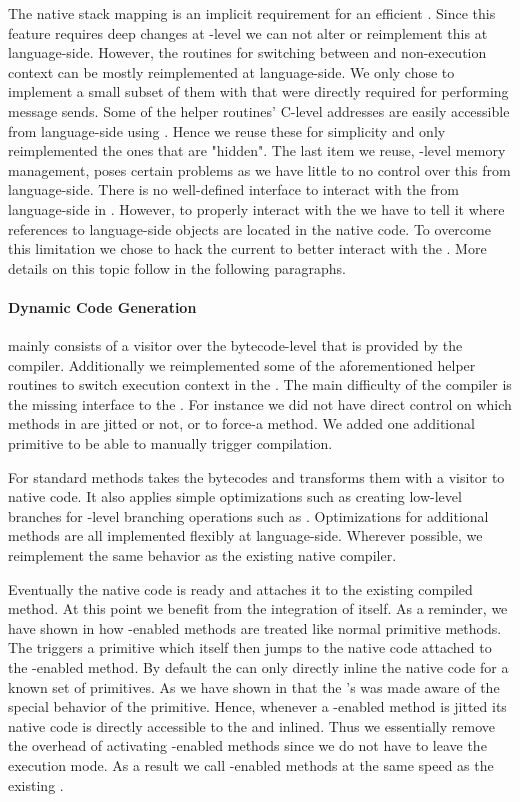 \noindent The native stack mapping is an implicit requirement for an efficient \JIT.
Since this feature requires deep changes at \VM-level we can not alter or reimplement this at language-side.
However, the routines for switching between \JIT and non-\JIT execution context can be mostly reimplemented at language-side.
We only chose to implement a small subset of them with \B that were directly required for performing message sends.
Some of the helper routines' C-level addresses are easily accessible from language-side using .
Hence we reuse these for simplicity and only reimplemented the ones that are "hidden".
The last item we reuse, \JIT-level memory management, poses certain problems as we have little to no control over this from language-side.
There is no well-defined interface to interact with the \JIT from language-side in \PH.
However, to properly interact with the \JIT we have to tell it where references to language-side objects are located in the native code.
To overcome this limitation we chose to hack the current \VM to better interact with the \JIT.
More details on this topic follow in the following paragraphs.

\paragraph{\NBJ Dynamic Code Generation}
\NB mainly consists of a visitor over the bytecode-level \IR that is provided by the \PH compiler.
Additionally we reimplemented some of the aforementioned helper routines to switch execution context in the \VM.
The main difficulty of the \NBJ compiler is the missing interface to the \JIT.
For instance we did not have direct control on which methods in \PH are jitted or not, or to force-\JIT a method.
We added one additional primitive to be able to manually trigger \JIT compilation.

For standard methods \NBJ takes the bytecodes and transforms them with a visitor to native code.
It also applies simple optimizations such as creating low-level branches for \PH-level branching operations such as .
Optimizations for additional methods are all implemented flexibly at language-side.
Wherever possible, we reimplement the same behavior as the existing native \JIT compiler.

Eventually the native code is ready and \B attaches it to the existing compiled method.
At this point we benefit from the \JIT integration of \B itself.
As a reminder, we have shown in  how \B-enabled methods are treated like normal primitive methods.
The \VM triggers a \B primitive which itself then jumps to the native code attached to the \B-enabled method.
By default the \Cog \JIT can only directly inline the native code for a known set of primitives.
As we have shown in  that the \Cog's \JIT was made aware of the special behavior of the \B primitive.
Hence, whenever a \B-enabled method is jitted its native code is directly accessible to the \JIT and inlined.
Thus we essentially remove the overhead of activating \B-enabled methods since we do not have to leave the \JIT execution mode.
As a result we call \B-enabled methods at the same speed as the existing \JIT.


